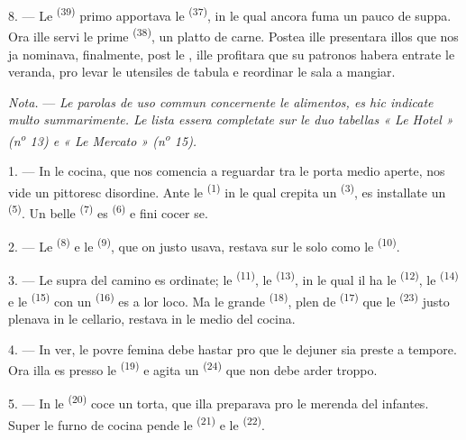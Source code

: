 8. --- Le  \textsuperscript{(39)} primo apportava le
 \textsuperscript{(37)}, in le qual ancora fuma un pauco de
suppa. Ora ille servi le prime  \textsuperscript{(38)}, un platto
de carne. Postea ille presentara illos que nos ja nominava, finalmente, post le
, ille profitara que su patronos habera entrate le
veranda, pro levar le utensiles de tabula e reordinar le sala a mangiar.

\textit{Nota.} --- \textit{Le parolas de uso commun concernente le alimentos, es
hic indicate multo summarimente. Le lista essera completate sur le duo tabellas
« Le Hotel » (n\textsuperscript{o} 13) e « Le Mercato »
(n\textsuperscript{o} 15).}

\VUsaut{4.6mm}
\VUsaut{3.0mm}

1. --- In le cocina, que nos comencia a reguardar tra le porta medio aperte, nos
vide un pittoresc disordine. Ante le  \textsuperscript{(1)} in le
qual crepita un  \textsuperscript{(3)}, es installate un
 \textsuperscript{(5)}. Un belle 
\textsuperscript{(7)} es  \textsuperscript{(6)} e fini
cocer se.

2. --- Le  \textsuperscript{(8)} e le  \textsuperscript{(9)}, que on justo usava, restava sur le solo como le
 \textsuperscript{(10)}.

3. --- Le supra del camino es ordinate; le 
\textsuperscript{(11)}, le 
\textsuperscript{(13)}, in le qual il ha le 
\textsuperscript{(12)}, le  \textsuperscript{(14)} e le
 \textsuperscript{(15)} con un 
\textsuperscript{(16)} es a lor loco. Ma le grande 
\textsuperscript{(18)}, plen de  \textsuperscript{(17)}
que le  \textsuperscript{(23)} justo plenava in le cellario,
restava in le medio del cocina.

4. --- In ver, le povre femina debe hastar pro que le dejuner sia preste a
tempore. Ora illa es presso le  \textsuperscript{(19)} e
agita un  \textsuperscript{(24)} que non debe arder troppo.

5. --- In le  \textsuperscript{(20)} coce un torta, que illa
preparava pro le merenda del infantes. Super le furno de cocina pende le
 \textsuperscript{(21)} e le  \textsuperscript{(22)}.

